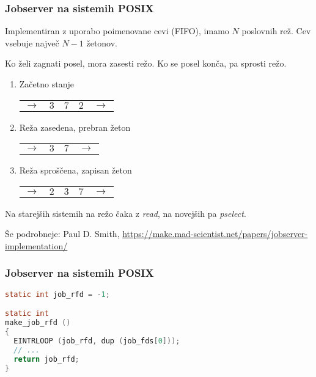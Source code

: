 \documentclass{beamer}
\begin{document}
\begin{frame}
  \frametitle{Jobserver na sistemih POSIX}

  Implementiran z uporabo poimenovane cevi (FIFO), imamo $N$ poslovnih
  rež. Cev vsebuje največ $N - 1$ žetonov.

  Ko želi zagnati posel, mora zasesti režo. Ko se posel konča, pa
  sprosti režo.
  
  \begin{enumerate}
  \item Začetno stanje
    
    \begin{tabular}{ cc|c|cc }
      \cline{2-4}
      $\rightarrow$ & $3$ & $7$ & $2$ & $\rightarrow$ \\
      \cline{2-4}
    \end{tabular}
    
  \item Reža zasedena, prebran žeton
    
    \begin{tabular}{ cc|cc }
      \cline{2-3}
      $\rightarrow$ & $3$ & $7$ & $\rightarrow$ \\
      \cline{2-3}
    \end{tabular}

  \item Reža sproščena, zapisan žeton

    \begin{tabular}{ cc|c|cc }
      \cline{2-4}
      $\rightarrow$ & $2$ & $3$ & $7$ & $\rightarrow$ \\
      \cline{2-4}
    \end{tabular}
    
  \end{enumerate}

  Na starejših sistemih na režo čaka z \textit{read}, na novejših pa \textit{pselect}.
  
  Še podrobneje:
  Paul D. Smith, \url{https://make.mad-scientist.net/papers/jobserver-implementation/}
\end{frame}

\begin{frame}[fragile]
  \frametitle{Jobserver na sistemih POSIX}

\begin{lstlisting}[language=C, basicstyle=\sffamily]
static int job_rfd = -1;

static int
make_job_rfd ()
{
  EINTRLOOP (job_rfd, dup (job_fds[0]));
  // ...
  return job_rfd;
}
\end{lstlisting}
\end{frame}
\end{document}

